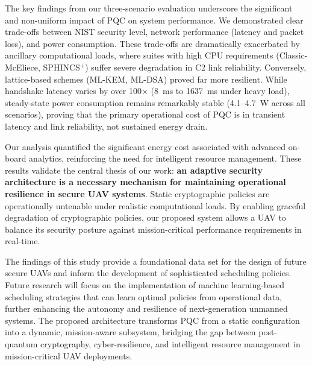 \documentclass[sigconf,natbib=false]{acmart}
\begin{document}
The key findings from our three-scenario evaluation underscore the significant and non-uniform impact of PQC on system performance. We demonstrated clear trade-offs between NIST security level, network performance (latency and packet loss), and power consumption. These trade-offs are dramatically exacerbated by ancillary computational loads, where suites with high CPU requirements (Classic-McEliece, SPHINCS$^+$) suffer severe degradation in C2 link reliability. Conversely, lattice-based schemes (ML-KEM, ML-DSA) proved far more resilient. While handshake latency varies by over 100$\times$ (8~ms to 1637~ms under heavy load), steady-state power consumption remains remarkably stable (4.1--4.7~W across all scenarios), proving that the primary operational cost of PQC is in transient latency and link reliability, not sustained energy drain.

Our analysis quantified the significant energy cost associated with advanced on-board analytics, reinforcing the need for intelligent resource management. These results validate the central thesis of our work: \textbf{an adaptive security architecture is a necessary mechanism for maintaining operational resilience in secure UAV systems}. Static cryptographic policies are operationally untenable under realistic computational loads. By enabling graceful degradation of cryptographic policies, our proposed system allows a UAV to balance its security posture against mission-critical performance requirements in real-time.

The findings of this study provide a foundational data set for the design of future secure UAVs and inform the development of sophisticated scheduling policies. Future research will focus on the implementation of machine learning-based scheduling strategies that can learn optimal policies from operational data, further enhancing the autonomy and resilience of next-generation unmanned systems. The proposed architecture transforms PQC from a static configuration into a dynamic, mission-aware subsystem, bridging the gap between post-quantum cryptography, cyber-resilience, and intelligent resource management in mission-critical UAV deployments.


\printbibliography
\end{document}
